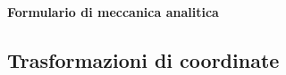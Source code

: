 \documentclass[11pt,landscape]{article}
\begin{document}
\raggedright
\footnotesize

\begin{center}
     \Large{\textbf{Formulario di meccanica analitica}} \\
\end{center}
\begin{multicols}{3}
\setlength{\premulticols}{1pt}
\setlength{\postmulticols}{1pt}
\setlength{\multicolsep}{1pt}
\setlength{\columnsep}{2pt}

\renewcommand{\vec}[1]{\underline{#1}}
\newcommand{\e}[0]{\hat{e}}
\newcommand{\de}[2]{\frac{\partial #1}{\partial #2}}
\newcommand{\ddt}[0]{\frac{\dif}{\dif t}}
\newcommand{\I}[0]{\mathcal{I}}
\newcommand{\Lag}[0]{\mathcal{L}}
\newcommand{\Ham}[0]{\mathcal{H}}

\newcommand{\dipdue}[0]{(t, q^k)}
\newcommand{\diptre}[0]{(t, q^k, \dot q ^k)}

\section{Trasformazioni di coordinate}

\end{multicols}
\end{document}
